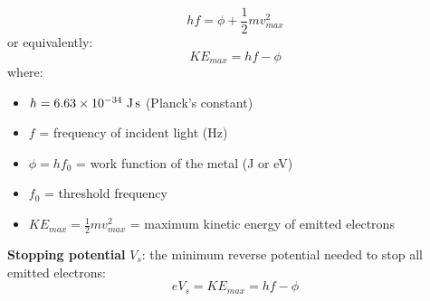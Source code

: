 \begin{lawbox}
\[
  hf = \phi + \frac{1}{2}mv_{max}^2
\]
or equivalently:
\[
  KE_{max} = hf - \phi
\]
where:
\begin{itemize}[noitemsep]
  \item $h = 6.63\times10^{-34}\ \text{J\,s}$
  (Planck's constant)
  \item $f$ = frequency of incident light (Hz)
  \item $\phi = hf_0$ = work function of the metal (J or eV)
  \item $f_0$ = threshold frequency
  \item $KE_{max} = \frac{1}{2}mv_{max}^2$ = maximum
  kinetic energy of emitted electrons
\end{itemize}

\textbf{Stopping potential} $V_s$: the minimum
reverse potential needed to stop all emitted electrons:
\[
  eV_s = KE_{max} = hf - \phi
\]
\end{lawbox}

